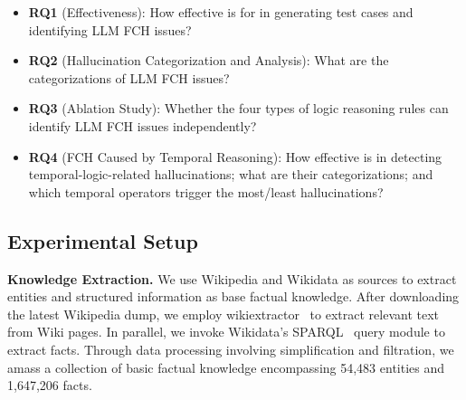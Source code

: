 \begin{itemize}[wide]
\item \textbf{RQ1} (Effectiveness): How effective is \tool for in generating test cases and identifying LLM FCH issues?

\item \textbf{RQ2} (Hallucination Categorization and Analysis): What are the categorizations of LLM FCH issues? 

\item \textbf{RQ3} (Ablation Study): Whether the four types of logic reasoning rules %
can identify LLM FCH issues independently? 

\item \textbf{RQ4} (FCH Caused by Temporal Reasoning): 
How effective is \tool in detecting temporal-logic-related hallucinations; what are their categorizations; 
and which temporal operators trigger the most/least hallucinations? 
\end{itemize}




\subsection{Experimental Setup}\label{sec:ex_setup}
\noindent \textbf{Knowledge Extraction.} 
We use Wikipedia and Wikidata as sources to extract entities and structured information as base factual knowledge. After downloading the latest Wikipedia dump, we employ wikiextractor~\cite{Wikiextractor2015} to extract relevant text from Wiki pages. In parallel, we invoke Wikidata's SPARQL~\cite{sparql} query module to extract facts. 
Through data processing involving simplification and filtration, we amass a collection of basic factual knowledge encompassing 54,483 entities and 1,647,206 facts. %


